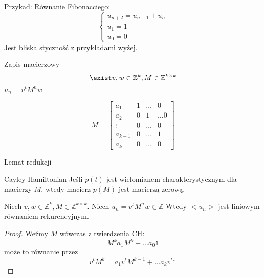 \documentclass{beamer}
\theoremstyle{definition}
\begin{document}
\begin{frame}
    Przykad:
    Równanie Fibonacciego:
   \begin{equation*}
        \begin{cases}
        u_{n+2} = u_{n+1} + u_n \\
        u_{1} = 1 \\
        u_{0} = 0
        \end{cases}
    \end{equation*}
    Jest bliska styczność z przykładami wyżej. 

\end{frame}

\begin{frame}{Zapis macierzowy}
    $$\exist v, w \in \mathbb{Z}^{k}, M \in \mathbb{Z}^{k\times k} $$
    $u_n = v^{t}M^{n}w$
    
    $$
    M = \begin{bmatrix}
    a_1 & 1 &  \ldots & 0 \\
    a_2 & 0 & 1 & \ldots 0  \\
    \vdots & 0 & \ldots & 0 \\ 
    a_{k-1} & 0 & \ldots & 1 \\
    a_k & 0 & \ldots & 0
    \end{bmatrix}
    $$
\end{frame}

\begin{frame}{Lemat redukcji}

\begin{theorem}{Cayley-Hamiltonian}
    Jeśli $p(t)$ jest wielomianem charakterystycznym dla macierzy $M$, wtedy macierz $p(M)$ jest macierzą zerową. 
\end{theorem}

\begin{theorem}

    Niech $v, w \in \mathbb{Z}^{k}, M \in \mathbb{Z}^{k\times k}$.
    Niech $u_n = v^{t}M^{n}w \in \mathbb{Z}$
    Wtedy $<u_n>$ jest liniowym równaniem rekurencyjnym. 
        
\end{theorem}



\begin{proof}
    Weźmy $M$ wówczas z twierdzenia CH: 
    $$M^{k} a_1 M^{k} + \ldots a_0 \mathbb{1}$$ 
    może to równanie przez 
    $$ v^{t}M^{k} = a_1 v^{t} M^{k-1} + \ldots a_k v^{t} \mathbb{1}$$ 
\end{proof}

\end{frame}
\end{document}

